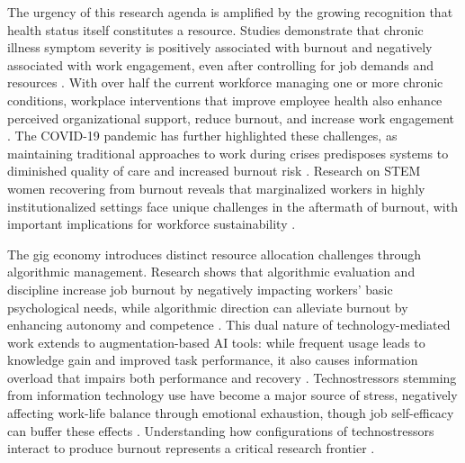 \documentclass[preprint,review,11pt]{elsarticle}
\begin{document}
The urgency of this research agenda is amplified by the growing recognition that health status itself constitutes a resource. Studies demonstrate that chronic illness symptom severity is positively associated with burnout and negatively associated with work engagement, even after controlling for job demands and resources \citep{cook_individual_2024}. With over half the current workforce managing one or more chronic conditions, workplace interventions that improve employee health also enhance perceived organizational support, reduce burnout, and increase work engagement \citep{haynes_evaluating_2021}. The COVID-19 pandemic has further highlighted these challenges, as maintaining traditional approaches to work during crises predisposes systems to diminished quality of care and increased burnout risk \citep{yoo_critical_2022}. Research on STEM women recovering from burnout reveals that marginalized workers in highly institutionalized settings face unique challenges in the aftermath of burnout, with important implications for workforce sustainability \citep{lee_beyond_2024}.

The gig economy introduces distinct resource allocation challenges through algorithmic management. Research shows that algorithmic evaluation and discipline increase job burnout by negatively impacting workers' basic psychological needs, while algorithmic direction can alleviate burnout by enhancing autonomy and competence \citep{peng_every_2025}. This dual nature of technology-mediated work extends to augmentation-based AI tools: while frequent usage leads to knowledge gain and improved task performance, it also causes information overload that impairs both performance and recovery \citep{shao_using_2024}. Technostressors stemming from information technology use have become a major source of stress, negatively affecting work-life balance through emotional exhaustion, though job self-efficacy can buffer these effects \citep{ma_impact_2021}. Understanding how configurations of technostressors interact to produce burnout represents a critical research frontier \citep{pflügner_deconstructing_2024}.
\end{document}
